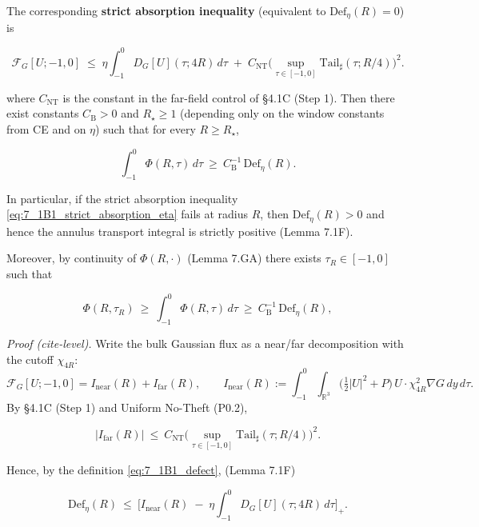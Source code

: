 \documentclass[
  11pt,
]{article}
\begin{document}
The corresponding \textbf{strict absorption inequality} (equivalent to \(\mathrm{Def}_\eta(R)=0\)) is

\begin{equation}
\mathcal F_G[U;-1,0]
\;\le\;\eta\int_{-1}^{0}D_G[U](\tau;4R)\,d\tau
\;+\;C_{\mathrm{NT}}\Big(\sup_{\tau\in[-1,0]}\mathrm{Tail}_\sharp(\tau;R/4)\Big)^2.
\tag{7.1B1}\label{eq:7_1B1_strict_absorption_eta}
\end{equation}

where \(C_{\mathrm{NT}}\) is the constant in the far-field control of §4.1C (Step 1). Then there exist constants \(C_{\mathrm{B}}>0\) and \(R_\star\ge 1\) (depending only on the window constants from CE and on \(\eta\)) such that for every \(R\ge R_\star\),

\begin{equation}
\int_{-1}^{0}\Phi(R,\tau)\,d\tau\ \ge\ C_{\mathrm{B}}^{-1}\,\mathrm{Def}_\eta(R).
\tag{7.1B2}\label{eq:7_1B2_transport_lower_bound}
\end{equation}

In particular, if the strict absorption inequality \eqref{eq:7_1B1_strict_absorption_eta} fails at radius \(R\), then \(\mathrm{Def}_\eta(R)>0\) and hence the annulus transport integral is strictly positive (Lemma 7.1F).

Moreover, by continuity of \(\Phi(R,\cdot)\) (Lemma 7.GA) there exists \(\tau_R\in[-1,0]\) such that

\begin{equation}
\Phi(R,\tau_R)\ \ge\ \int_{-1}^0\Phi(R,\tau)\,d\tau
\ \ge\ C_{\mathrm{B}}^{-1}\,\mathrm{Def}_\eta(R),
\tag{7.1B3}\label{eq:7_1B3_transport_pointwise}
\end{equation}

\emph{Proof (cite-level).} Write the bulk Gaussian flux as a near/far decomposition with the cutoff \(\chi_{4R}\): \[
\mathcal F_G[U;-1,0]=I_{\mathrm{near}}(R)+I_{\mathrm{far}}(R),
\qquad
I_{\mathrm{near}}(R):=\int_{-1}^{0}\!\!\int_{\mathbb R^3}
\Big(\tfrac12|U|^2+P\Big)\,U\cdot\chi_{4R}^2\nabla G\,dy\,d\tau.
\] By §4.1C (Step 1) and Uniform No-Theft (P0.2),

\begin{equation}
|I_{\mathrm{far}}(R)|
\ \le\ C_{\mathrm{NT}}\Big(\sup_{\tau\in[-1,0]}\mathrm{Tail}_\sharp(\tau;R/4)\Big)^2.
\tag{7.1B4}\label{eq:7_1B4_far_control}
\end{equation}

Hence, by the definition \eqref{eq:7_1B1_defect}, (Lemma 7.1F)

\begin{equation}
\mathrm{Def}_\eta(R)
\ \le\
\Big[I_{\mathrm{near}}(R)\;-\;\eta\int_{-1}^{0}D_G[U](\tau;4R)\,d\tau\Big]_+.
\tag{7.1B5}\label{eq:7_1B5_defect_reduced_to_near}
\end{equation}
\end{document}
